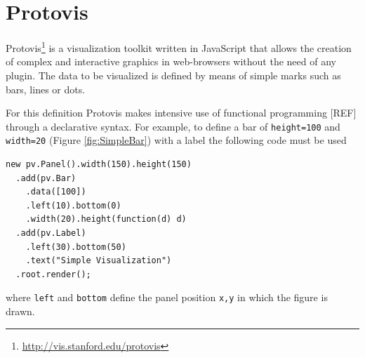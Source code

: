 \documentclass[preprint,10pt]{sigplanconf}
\newcommand{\ct}{\lstinline[backgroundcolor=\color{white},basicstyle=\footnotesize\ttfamily]}
\begin{document}
\section{Protovis}
Protovis\footnote{\url{http://vis.stanford.edu/protovis}} is a visualization toolkit written in JavaScript that allows the creation of complex and interactive graphics in web-browsers without the need of any plugin. The data to be visualized is defined by means of simple marks such as bars, lines or dots. 

For this definition Protovis makes intensive use of functional programming [REF] through a declarative syntax. For example, to define a bar of \ct{height=100} and \ct{width=20} (Figure \ref{fig:SimpleBar}) with a label the following code must be used
\begin{lstlisting} 
new pv.Panel().width(150).height(150)
  .add(pv.Bar)
    .data([100])
    .left(10).bottom(0)
    .width(20).height(function(d) d)
  .add(pv.Label)
    .left(30).bottom(50)
    .text("Simple Visualization")
  .root.render();
\end{lstlisting}
where \ct{left} and \ct{bottom} define the panel position \ct{x,y} in which the figure is drawn.
\end{document}
